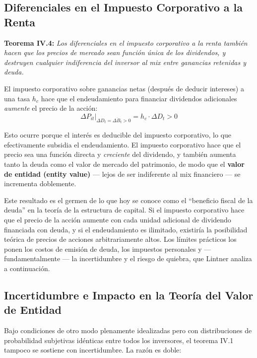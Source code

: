 \documentclass[12pt]{article}
\begin{document}
\subsection{Diferenciales en el Impuesto Corporativo a la Renta}

\textbf{Teorema IV.4:} \textit{Los diferenciales en el impuesto corporativo a la renta tambi\'en hacen que los precios de mercado sean funci\'on \'unica de los dividendos, y destruyen cualquier indiferencia del inversor al mix entre ganancias retenidas y deuda.}

El impuesto corporativo sobre ganancias netas (despu\'es de deducir intereses) a una tasa $h_c$ hace que el endeudamiento para financiar dividendos adicionales \textit{aumente} el precio de la acci\'on:
\begin{equation}
\Delta P_{it}\bigg|_{\Delta D_t = \Delta \dot{B}_t > 0} = h_c \cdot \Delta D_t > 0
\end{equation}

Esto ocurre porque el inter\'es es deducible del impuesto corporativo, lo que efectivamente subsidia el endeudamiento. El impuesto corporativo hace que el precio sea una funci\'on directa y \textit{creciente} del dividendo, y tambi\'en aumenta tanto la deuda como el valor de mercado del patrimonio, de modo que el \textbf{valor de entidad (entity value)} --- lejos de ser indiferente al mix financiero --- se incrementa doblemente.

\begin{explicacion}
Este resultado es el germen de lo que hoy se conoce como el ``beneficio fiscal de la deuda'' en la teor\'ia de la estructura de capital. Si el impuesto corporativo hace que el precio de la acci\'on aumente con cada unidad adicional de dividendo financiada con deuda, y si el endeudamiento es ilimitado, existir\'ia la posibilidad te\'orica de precios de acciones arbitrariamente altos. Los l\'imites pr\'acticos los ponen los costos de emisi\'on de deuda, los impuestos personales y --- fundamentalmente --- la incertidumbre y el riesgo de quiebra, que Lintner analiza a continuaci\'on.
\end{explicacion}

\subsection{Incertidumbre e Impacto en la Teor\'ia del Valor de Entidad}

Bajo condiciones de otro modo plenamente idealizadas pero con distribuciones de probabilidad subjetivas id\'enticas entre todos los inversores, el teorema IV.1 tampoco se sostiene con incertidumbre. La raz\'on es doble:
\end{document}
